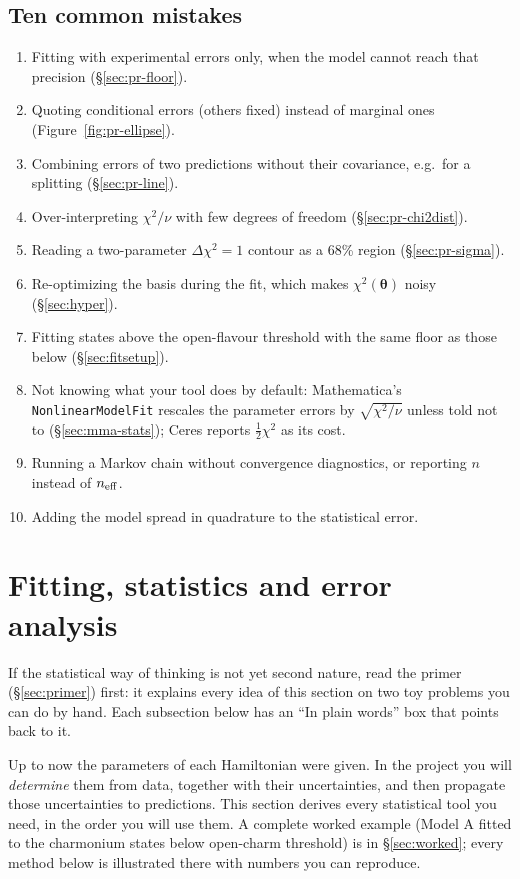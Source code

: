 \documentclass[11pt,a4paper]{article}
\numberwithin{equation}{section}
\theoremstyle{definition}
\theoremstyle{plain}
\theoremstyle{remark}
\numberwithin{algorithm}{section}
\newcommand{\vth}{\bm\theta}
\begin{document}
\subsection{Ten common mistakes}\label{sec:pr-mistakes}
\begin{enumerate}[leftmargin=1.8em,itemsep=2pt]
\item Fitting with experimental errors only, when the model cannot reach that precision (\S\ref{sec:pr-floor}).
\item Quoting conditional errors (others fixed) instead of marginal ones (Figure~\ref{fig:pr-ellipse}).
\item Combining errors of two predictions without their covariance, e.g.\ for a splitting (\S\ref{sec:pr-line}).
\item Over-interpreting $\chi^2/\nu$ with few degrees of freedom (\S\ref{sec:pr-chi2dist}).
\item Reading a two-parameter $\Delta\chi^2=1$ contour as a 68\% region (\S\ref{sec:pr-sigma}).
\item Re-optimizing the basis during the fit, which makes $\chi^2(\vth)$ noisy (\S\ref{sec:hyper}).
\item Fitting states above the open-flavour threshold with the same floor as those below (\S\ref{sec:fitsetup}).
\item Not knowing what your tool does by default: Mathematica's \texttt{NonlinearModelFit} rescales the parameter errors by $\sqrt{\chi^2/\nu}$ unless told not to (\S\ref{sec:mma-stats}); Ceres reports $\frac12\chi^2$ as its cost.
\item Running a Markov chain without convergence diagnostics, or reporting $n$ instead of $n_{\rm eff}$.
\item Adding the model spread in quadrature to the statistical error.
\end{enumerate}
\section{Fitting, statistics and error analysis}\label{sec:stats}

If the statistical way of thinking is not yet second nature, read the primer (\S\ref{sec:primer}) first: it explains every idea of this section on two toy problems you can do by hand. Each subsection below has an ``In plain words'' box that points back to it.

Up to now the parameters of each Hamiltonian were given. In the project you will \emph{determine} them from data, together with their uncertainties, and then propagate those uncertainties to predictions. This section derives every statistical tool you need, in the order you will use them. A complete worked example (Model A fitted to the charmonium states below open-charm threshold) is in \S\ref{sec:worked}; every method below is illustrated there with numbers you can reproduce.
\end{document}
